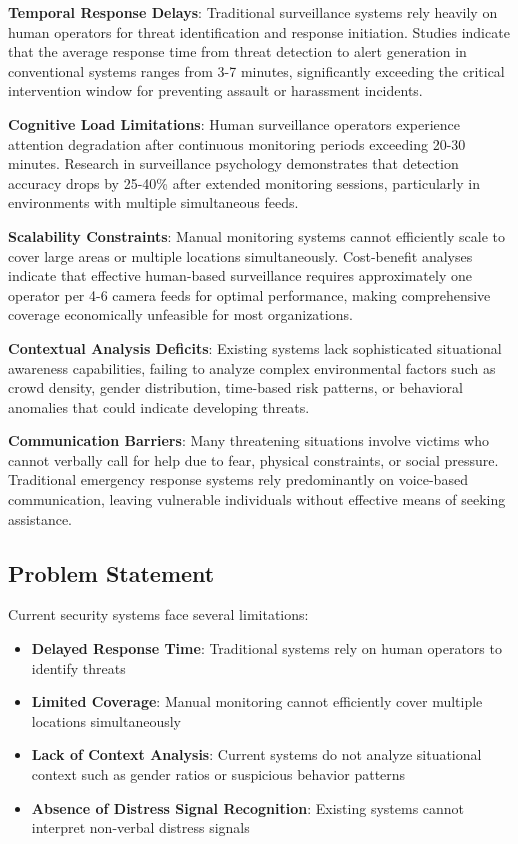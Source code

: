\documentclass[12pt,a4paper]{article}
\begin{document}
\textbf{Temporal Response Delays}: Traditional surveillance systems rely heavily on human operators for threat identification and response initiation. Studies indicate that the average response time from threat detection to alert generation in conventional systems ranges from 3-7 minutes, significantly exceeding the critical intervention window for preventing assault or harassment incidents.

\textbf{Cognitive Load Limitations}: Human surveillance operators experience attention degradation after continuous monitoring periods exceeding 20-30 minutes. Research in surveillance psychology demonstrates that detection accuracy drops by 25-40\% after extended monitoring sessions, particularly in environments with multiple simultaneous feeds.

\textbf{Scalability Constraints}: Manual monitoring systems cannot efficiently scale to cover large areas or multiple locations simultaneously. Cost-benefit analyses indicate that effective human-based surveillance requires approximately one operator per 4-6 camera feeds for optimal performance, making comprehensive coverage economically unfeasible for most organizations.

\textbf{Contextual Analysis Deficits}: Existing systems lack sophisticated situational awareness capabilities, failing to analyze complex environmental factors such as crowd density, gender distribution, time-based risk patterns, or behavioral anomalies that could indicate developing threats.

\textbf{Communication Barriers}: Many threatening situations involve victims who cannot verbally call for help due to fear, physical constraints, or social pressure. Traditional emergency response systems rely predominantly on voice-based communication, leaving vulnerable individuals without effective means of seeking assistance.

\subsection{Problem Statement}
Current security systems face several limitations:
\begin{itemize}
    \item \textbf{Delayed Response Time}: Traditional systems rely on human operators to identify threats
    \item \textbf{Limited Coverage}: Manual monitoring cannot efficiently cover multiple locations simultaneously  
    \item \textbf{Lack of Context Analysis}: Current systems do not analyze situational context such as gender ratios or suspicious behavior patterns
    \item \textbf{Absence of Distress Signal Recognition}: Existing systems cannot interpret non-verbal distress signals
\end{itemize}
\end{document}
